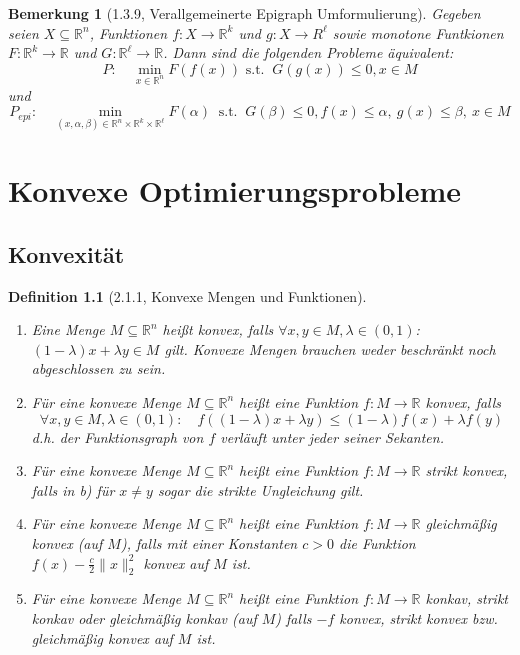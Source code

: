 \documentclass[12pt]{extreport} %
\newcommand{\R}{\mathbb{R}}
\theoremstyle{named}
\theoremstyle{nnamed}
\theoremstyle{itshape}
\newtheorem*{definition}{Definition}
\theoremstyle{normal}
\newtheorem*{bemerkung}{Bemerkung}
\begin{document}
\begin{bemerkung}[1.3.9, Verallgemeinerte Epigraph Umformulierung]
	Gegeben seien $X \subseteq \R^n$, Funktionen $f \colon X \rightarrow \R^k$ und $g \colon X \rightarrow R^\ell$ sowie monotone Funtkionen $F \colon \R^k \rightarrow \R$ und $G \colon \R^\ell \rightarrow \R$. Dann sind die folgenden Probleme äquivalent:
	$$ P: \quad \min_{x \in \R^n} F(f(x)) \text{ s.t. }~ G(g(x)) \leq 0, x \in M $$
	und 
		$$ P_{epi}: \quad \min_{(x, \alpha, \beta) \in \R^n \times \R^k \times \R^\ell} F(\alpha) ~\text{ s.t. }~ G(\beta) \leq 0,  f(x) \leq \alpha, ~ g(x) \leq \beta, ~ x\in M $$
\end{bemerkung}

\chapter{Konvexe Optimierungsprobleme}

\section{Konvexität}

\begin{definition}[2.1.1, Konvexe Mengen und Funktionen] ~\
	\begin{enumerate}
		\item Eine Menge $M \subseteq \R^n$ heißt konvex, falls $\forall x, y \in M, \lambda \in (0, 1)$: $(1 - \lambda) x + \lambda y \in M$ gilt. Konvexe Mengen brauchen weder beschränkt noch abgeschlossen zu sein.
		\item Für eine konvexe Menge $M \subseteq \R^n$ heißt eine Funktion $f \colon M \rightarrow \R$ konvex, falls
			$$ \forall x, y \in M, \lambda \in (0, 1): \quad f( (1-\lambda)x + \lambda y) \leq (1- \lambda) f(x) + \lambda f(y) $$
			d.h. der Funktionsgraph von $f$ verläuft unter jeder seiner Sekanten.
		\item Für eine konvexe Menge $M \subseteq \R^n$ heißt eine Funktion $f \colon M \rightarrow \R$ strikt konvex, falls in b) für $x \ne y$ sogar die strikte Ungleichung gilt.
		\item Für eine konvexe Menge $M \subseteq \R^n$ heißt eine Funktion $f \colon M \rightarrow \R$ gleichmäßig konvex (auf $M$), falls mit einer Konstanten $c > 0$ die Funktion $f(x) - \frac{c}{2} \| x \|_2^2$ konvex auf $M$ ist.
		\item Für eine konvexe Menge $M \subseteq \R^n$ heißt eine Funktion $f \colon M \rightarrow \R$ konkav, strikt konkav oder gleichmäßig konkav (auf $M$) falls $-f$ konvex, strikt konvex bzw. gleichmäßig konvex auf $M$ ist.
	\end{enumerate}
\end{definition}
\end{document}
